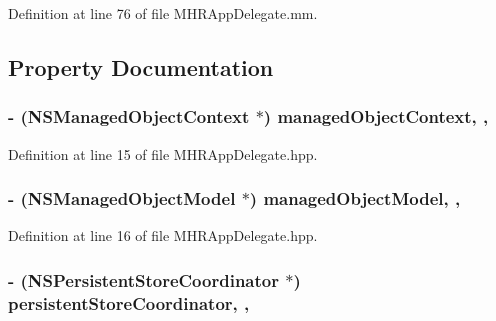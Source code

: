 Definition at line 76 of file M\+H\+R\+App\+Delegate.\+mm.



\subsection{Property Documentation}
\hypertarget{interface_m_h_r_app_delegate_a798999c986183b6b0f61070b46856713}{
\subsubsection[{managed\+Object\+Context}]{\setlength{\rightskip}{0pt plus 5cm}-\/ (N\+S\+Managed\+Object\+Context $\ast$) managed\+Object\+Context\hspace{0.3cm}{\ttfamily [read]}, {\ttfamily [nonatomic]}, {\ttfamily [strong]}}}\label{interface_m_h_r_app_delegate_a798999c986183b6b0f61070b46856713}


Definition at line 15 of file M\+H\+R\+App\+Delegate.\+hpp.

\hypertarget{interface_m_h_r_app_delegate_ab0f79ebe18e402e0249870b98354612b}{
\subsubsection[{managed\+Object\+Model}]{\setlength{\rightskip}{0pt plus 5cm}-\/ (N\+S\+Managed\+Object\+Model $\ast$) managed\+Object\+Model\hspace{0.3cm}{\ttfamily [read]}, {\ttfamily [nonatomic]}, {\ttfamily [strong]}}}\label{interface_m_h_r_app_delegate_ab0f79ebe18e402e0249870b98354612b}


Definition at line 16 of file M\+H\+R\+App\+Delegate.\+hpp.

\hypertarget{interface_m_h_r_app_delegate_ade32c3c30bed3706907d1a52c129da79}{
\subsubsection[{persistent\+Store\+Coordinator}]{\setlength{\rightskip}{0pt plus 5cm}-\/ (N\+S\+Persistent\+Store\+Coordinator $\ast$) persistent\+Store\+Coordinator\hspace{0.3cm}{\ttfamily [read]}, {\ttfamily [nonatomic]}, {\ttfamily [strong]}}}\label{interface_m_h_r_app_delegate_ade32c3c30bed3706907d1a52c129da79}


